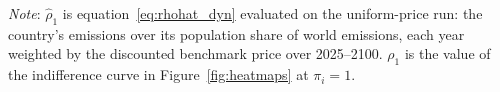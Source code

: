 \documentclass[12pt,english]{article}
\theoremstyle{remark}
\begin{document}

\begin{table}[tbp]
\centering
\small
\singlespacing
\begin{threeparttable}
\caption{Allocation at which each country is indifferent when the autarky price equals the benchmark ($\pi_i=1$).}
\label{tab:summary}
\begin{tablenotes}\footnotesize
  \item \emph{Note}: $\hat\rho_1$ is equation~\eqref{eq:rhohat_dyn} evaluated on the uniform-price run: the country's emissions over its population share of world emissions, each year weighted by the discounted benchmark price over 2025--2100. $\rho_1$ is the value of the indifference curve in Figure~\ref{fig:heatmaps} at $\pi_i = 1$.
\end{tablenotes}
\end{threeparttable}
\end{table}

\end{document}
